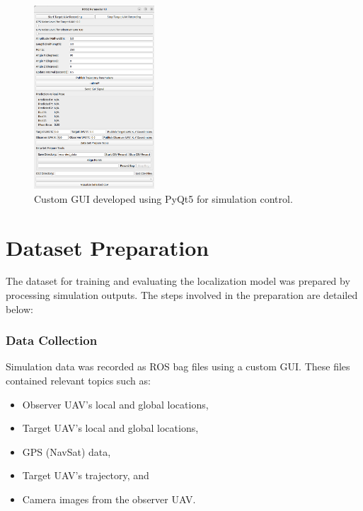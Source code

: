 \begin{figure}[H]
    \centering
    \includegraphics[width=0.4\textwidth]{Imgs/gui.png}
    \caption{Custom GUI developed using PyQt5 for simulation control.}
    \label{fig:gui_interface}
\end{figure}



\section{Dataset Preparation}

The dataset for training and evaluating the localization model was prepared by processing simulation outputs. The steps involved in the preparation are detailed below:

\subsubsection{Data Collection}
Simulation data was recorded as ROS bag files using a custom GUI. These files contained relevant topics such as:
\begin{itemize}
    \item Observer UAV’s local and global locations,
    \item Target UAV’s local and global locations,
    \item GPS (NavSat) data,
    \item Target UAV's trajectory, and
    \item Camera images from the observer UAV.
\end{itemize}


